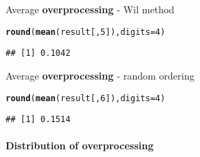 \documentclass{article}\usepackage[]{graphicx}\usepackage[]{color}
\makeatletter
\newcommand{\hlnum}[1]{\textcolor[rgb]{0.686,0.059,0.569}{#1}}%
\newcommand{\hlstd}[1]{\textcolor[rgb]{0.345,0.345,0.345}{#1}}%
\newcommand{\hlkwc}[1]{\textcolor[rgb]{0.333,0.667,0.333}{#1}}%
\newcommand{\hlkwd}[1]{\textcolor[rgb]{0.737,0.353,0.396}{\textbf{#1}}}%
\newenvironment{kframe}{%
 \def\at@end@of@kframe{}%
 \ifinner\ifhmode%
  \def\at@end@of@kframe{\end{minipage}}%
  \begin{minipage}{\columnwidth}%
 \fi\fi%
 \def\FrameCommand##1{\hskip\@totalleftmargin \hskip-\fboxsep
 \colorbox{shadecolor}{##1}\hskip-\fboxsep
     \hskip-\linewidth \hskip-\@totalleftmargin \hskip\columnwidth}%
 \MakeFramed {\advance\hsize-\width
   \@totalleftmargin\z@ \linewidth\hsize
   \@setminipage}}%
 {\par\unskip\endMakeFramed%
 \at@end@of@kframe}
\newenvironment{knitrout}{}{} %
\makeatother
\begin{document}
Average \textbf{overprocessing} - Wil method

\begin{knitrout}
\color{fgcolor}\begin{kframe}
\begin{alltt}
\hlkwd{round}\hlstd{(}\hlkwd{mean}\hlstd{(result[,}\hlnum{5}\hlstd{]),}\hlkwc{digits} \hlstd{=} \hlnum{4}\hlstd{)}
\end{alltt}
\begin{verbatim}
## [1] 0.1042
\end{verbatim}
\end{kframe}
\end{knitrout}

Average \textbf{overprocessing} - random ordering

\begin{knitrout}
\color{fgcolor}\begin{kframe}
\begin{alltt}
\hlkwd{round}\hlstd{(}\hlkwd{mean}\hlstd{(result[,}\hlnum{6}\hlstd{]),}\hlkwc{digits} \hlstd{=} \hlnum{4}\hlstd{)}
\end{alltt}
\begin{verbatim}
## [1] 0.1514
\end{verbatim}
\end{kframe}
\end{knitrout}

\paragraph{Distribution of overprocessing}
\end{document}
